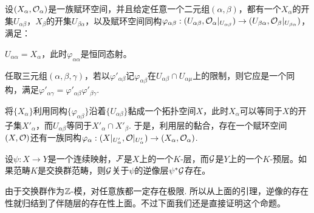 \begin{pro}[赋环空间的黏合]\label{rsn}
设$(X_\alpha,\mathcal{O}_\alpha)$是一族赋环空间，并且给定任意一个二元组$(\alpha,\beta)$，都有一个$X_\alpha$的开集$U_{\alpha\beta}$，$X_\beta$的开集$U_{\beta\alpha}$，以及赋环空间同构$\varphi_{\alpha\beta}:(U_{\alpha\beta},\mathcal{O}_\alpha|_{U_{\alpha\beta}})\to (U_{\beta\alpha},\mathcal{O}_\beta|_{U_{\beta\alpha}})$，满足：
\begin{compactenum}[~~~1.]
\item $U_{\alpha\alpha}=X_\alpha$，此时$\varphi_{\alpha\alpha}$是恒同态射。
\item 任取三元组$(\alpha,\beta,\gamma)$，若以$\varphi'_{\alpha\beta}$记$\varphi_{\alpha\beta}$在$U_{\alpha\beta}\cap U_{\alpha\mu}$上的限制，则它应是一个同构，满足$\varphi'_{\alpha\gamma}=\varphi'_{\alpha\beta}\varphi'_{\beta\gamma}$.
\end{compactenum}

将$\{X_\alpha\}$利用同构$\{\varphi_{\alpha\beta}\}$沿着$\{U_{\alpha\beta}\}$黏成一个拓扑空间$X$，此时$X_\alpha$可以等同于$X$的开子集$X'_\alpha$，而$U_{\alpha\beta}$等同于$X'_\alpha\cap X'_\beta$. 于是，利用层的黏合，存在一个赋环空间$(X,\mathcal{O})$还有一族同构$\varphi_\alpha:(X|_{U'_\alpha},\mathcal{O}|_{U'_\alpha})\to (X_\alpha,\mathcal{O}_\alpha)$.
\end{pro}

\begin{thm}\label{proinverse}
设$\psi:X\to Y$是一个连续映射，$\mathcal{F}$是$X$上的一个$K$-层，而$\mathcal{G}$是$Y$上的一个$K$-预层。如果范畴$K$是交换群范畴，则$\mathcal{G}$关于$\psi$的逆像层$\psi^*\mathcal{G}$存在。
\end{thm}

由于交换群作为$\mathbb{Z}$-模，对任意族都一定存在极限. 所以从上面的引理，逆像的存在性就归结到了伴随层的存在性上面。不过下面我们还是直接证明这个命题。

